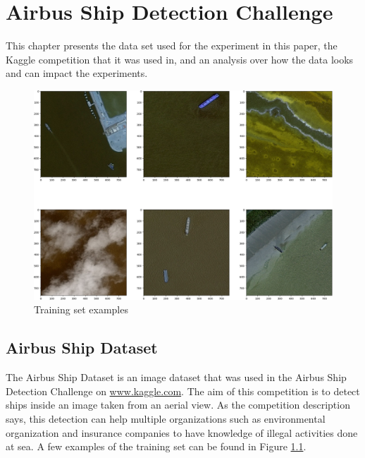 \chapter{Airbus Ship Detection Challenge}
\label{DatasetChapter}

This chapter presents the data set used for the experiment in this paper, the Kaggle competition that it was used in, and an analysis over how the data looks and can impact the experiments.

\begin{figure}[H]
	\includegraphics[width=\textwidth]{Pictures/003TrainingSetExamples.png}
	\caption{Training set examples}
	\label{TrainSetExample}
\end{figure}

\section{Airbus Ship Dataset}
The Airbus Ship Dataset is an image dataset that was used in the Airbus Ship Detection Challenge \cite{AirbusDataSetChallenge} on \url{www.kaggle.com}. The aim of this competition is to detect ships inside an image taken from an aerial view. As the competition description says, this detection can help multiple organizations such as environmental organization and insurance companies to have knowledge of illegal activities done at sea. A few examples of the training set can be found in Figure \ref{TrainSetExample}.


